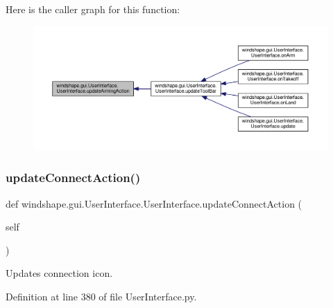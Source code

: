 Here is the caller graph for this function\+:\nopagebreak
\begin{figure}[H]
\begin{center}
\leavevmode
\includegraphics[width=350pt]{classwindshape_1_1gui_1_1_user_interface_1_1_user_interface_a6eea698663fbc82963d3984b0a9a8ef1_icgraph}
\end{center}
\end{figure}
\mbox{\label{classwindshape_1_1gui_1_1_user_interface_1_1_user_interface_a18f90d2c6c5635130e9181facda026c0}} 
\subsubsection{\texorpdfstring{update\+Connect\+Action()}{updateConnectAction()}}
{\footnotesize\ttfamily def windshape.\+gui.\+User\+Interface.\+User\+Interface.\+update\+Connect\+Action (\begin{DoxyParamCaption}\item[{}]{self }\end{DoxyParamCaption})}

\begin{DoxyVerb}Updates connection icon.\end{DoxyVerb}
 

Definition at line 380 of file User\+Interface.\+py.

